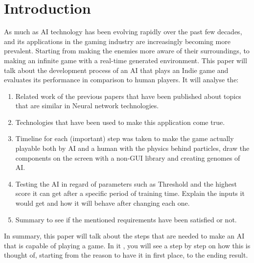 \chapter{Introduction}
As much as AI technology has been evolving rapidly over the past few decades, and its applications in the gaming industry are increasingly becoming more prevalent. Starting from making the enemies more aware of their surroundings, to making an infinite game with a real-time generated environment. This paper will talk about the development process of an AI that plays an Indie game and evaluates its performance in comparison to human players. It will analyse the:

\begin{enumerate}
\item Related work of the previous papers that have been published about topics that are similar in Neural network technologies.
\item Technologies that have been used to make this application come true.
\item Timeline for each (important) step was taken to make the game actually playable both by AI and a human with the physics behind particles, draw the components on the screen with a non-GUI library and creating genomes of AI.
\item Testing the AI in regard of parameters such as Threshold and the highest score it can get after a specific period of training time. Explain the inputs it would get and how it will behave after changing each one.
\item Summary to see if the mentioned requirements have been satisfied or not.
\end{enumerate}

In summary, this paper will talk about the steps that are needed to make an AI that is capable of playing a game. In it , you will see a step by step on how this is thought of, starting from the reason to have it in first place, to the ending result.
